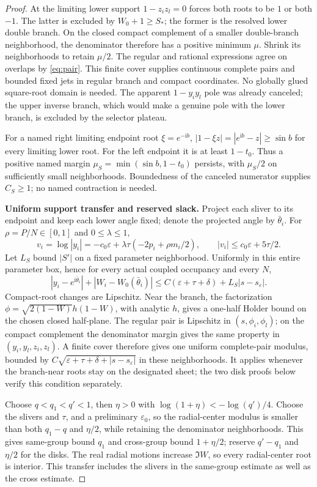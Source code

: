 \documentclass[11pt]{article}
\numberwithin{equation}{section}
\theoremstyle{definition}
\newcommand{\ii}{\mathrm i}
\newcommand{\eps}{\varepsilon}
\begin{document}
\begin{proof}
At the limiting lower support \(1-z_i z_l=0\) forces both
roots to be \(1\) or both \(-1\). The latter is excluded by
\(W_0+1\ge S_*\); the former is the resolved lower double branch.
On the closed compact complement of a smaller double-branch
neighborhood, the denominator therefore has a positive minimum
\(\mu\). Shrink its neighborhoods to retain \(\mu/2\).
The regular and rational expressions agree on overlaps by
\eqref{eq:pair}. This finite cover supplies continuous complete
pairs and bounded fixed jets in regular branch and compact
coordinates. No globally glued square-root domain is needed.
The apparent \(1-y_i y_l\) pole was already canceled; the upper
inverse branch, which would make a genuine pole with the lower
branch, is excluded by the selector plateau.

For a named right limiting endpoint root \(\xi=e^{-\ii b}\),
\(|1-\xi z|=|e^{\ii b}-z|\ge\sin b\) for every limiting lower
root. For the left endpoint it is at least \(1-t_0\).
Thus a positive named margin
\(\mu_S=\min(\sin b,1-t_0)\) persists, with \(\mu_S/2\)
on sufficiently small neighborhoods. Boundedness of the canceled
numerator supplies \(C_S\ge1\); no named contraction is needed.

\par\smallskip\noindent\textbf{Uniform support transfer and reserved slack.}
Project each sliver to its endpoint and keep each lower angle
fixed; denote the projected angle by \(\bar\theta_i\).
For \(\rho=P/N\in[0,1]\) and \(0\le\lambda\le1\),
\[
 v_i=\log|y_i|=-c_0\eps+\lambda\tau(-2p_i+\rho m_i/2),
 \qquad |v_i|\le c_0\eps+5\tau/2.
\]
Let \(L_S\) bound \(|S'|\) on a fixed parameter neighborhood.
Uniformly in this entire parameter box, hence for every actual
coupled occupancy and every \(N\),
\[
 |y_i-e^{\ii\bar\theta_i}|+|W_i-W_0(\bar\theta_i)|
 \le C(\eps+\tau+\delta)+L_S|s-s_\eps|.
\]
Compact-root changes are Lipschitz. Near the branch, the factorization
\(\phi=\sqrt{2(1-W)}h(1-W)\), with analytic \(h\), gives a
one-half Holder bound on the chosen closed half-plane.
The regular pair is Lipschitz in \((s,\phi_i,\phi_l)\);
on the compact complement the denominator margin gives the same
property in \((y_i,y_l,z_i,z_l)\). A finite cover therefore gives
one uniform complete-pair modulus, bounded by
\(C\sqrt{\eps+\tau+\delta+|s-s_\eps|}\) in these neighborhoods.
It applies whenever the branch-near roots stay on the designated
sheet; the two disk proofs below verify this condition separately.

Choose \(q<q_1<q'<1\), then \(\eta>0\) with
\(\log(1+\eta)<-\log(q')/4\).
Choose the slivers and \(\tau\), and a preliminary \(\eps_0\),
so the radial-center modulus is smaller than both \(q_1-q\)
and \(\eta/2\), while retaining the denominator neighborhoods.
This gives same-group bound \(q_1\) and cross-group bound
\(1+\eta/2\); reserve \(q'-q_1\) and \(\eta/2\) for the disks.
The real radial motions increase \(\Im W\), so every radial-center
root is interior. This transfer includes the slivers in the
same-group estimate as well as the cross estimate.


\end{proof}
\end{document}

